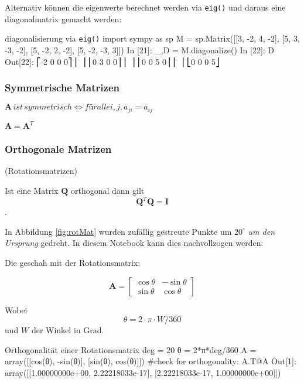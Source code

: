 Alternativ können die eigenwerte berechnet werden via \texttt{eig()} und daraus eine diagonalmatrix gemacht werden:
\begin{python}{diagonalisierung via \texttt{eig()}}
import sympy as sp  
M = sp.Matrix([[3, -2,  4, -2], 
               [5,  3, -3, -2], 
               [5, -2,  2, -2], 
               [5, -2, -3,  3]]) 
In [21]: _,D = M.diagonalize()
In [22]: D
Out[22]:
⎡-2  0  0  0⎤
⎢           ⎥
⎢0   3  0  0⎥
⎢           ⎥
⎢0   0  5  0⎥
⎢           ⎥
⎣0   0  0  5⎦
\end{python}


\subsubsection{Symmetrische Matrizen}

$\mathbf{A} \, ist \, symmetrisch \iff für alle i,j, a_{ji} = a_{ij}$

$\mathbf{A} = \mathbf{A}^T$



\subsubsection{Orthogonale Matrizen}
(Rotationsmatrizen)

Ist eine Matrix $\mathbf{Q}$ orthogonal dann gilt 
$$ \mathbf{Q}^T\mathbf{Q} = \mathbf{I} $$.


In Abbildung \ref{fig:rotMat} wurden zufällig gestreute Punkte um $20^\circ$ \emph{um den Ursprung} gedreht. In diesem Notebook kann dies nachvollzogen werden: 

Die geschah mit der Rotationsmatrix:


\begin{equation}
    {\displaystyle \mathbf{A}={\begin{bmatrix}\cos \theta &-\sin \theta \\\sin \theta &\cos \theta \end{bmatrix}}}
\end{equation}

Wobei $$\theta = 2\cdot \pi \cdot W / 360$$ und $W$ der Winkel in Grad.

\begin{python}{Orthogonalität einer Rotationsmatrix}
deg = 20
θ = 2*π*deg/360 
A = array([[cos(θ), -sin(θ)],
           [sin(θ), cos(θ)]])
#check for orthogonality:
A.T@A
Out[1]: array([[1.00000000e+00, 2.22218033e-17],
       [2.22218033e-17, 1.00000000e+00]])

\end{python}



